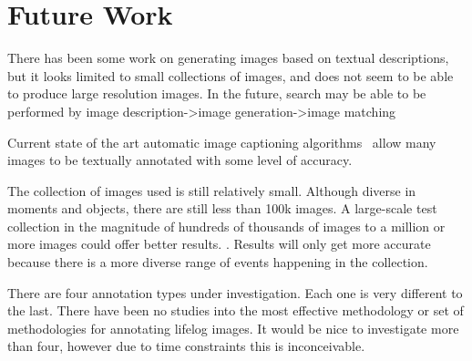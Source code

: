 \chapter{Future Work}


There has been some work on generating images based on textual descriptions, but it looks limited to small collections of images, and does not seem to be able to produce large resolution images. In the future, search may be able to be performed by image description->image generation->image matching 
 
Current state of the art automatic image captioning algorithms~\cite{karpathy2015deep} allow many images to be textually annotated with some level of accuracy. 
 
The collection of images used is still relatively small. Although diverse in moments and objects, there are still less than 100k images. A large-scale test collection in the magnitude of hundreds of thousands of images to a million or more images could offer better results. . Results will only get more accurate because there is a more diverse range of events happening in the collection.

There are four annotation types under investigation. Each one is very different to the last. There have been no studies into the most effective methodology or set of methodologies for annotating lifelog images. It would be nice to investigate more than four, however due to time constraints this is inconceivable.